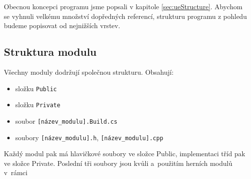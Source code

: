 \FloatBarrier

Obecnou koncepci programu jsme popsali v kapitole \ref{sec:ueStructure}. Abychom se vyhnuli velkému množství dopředných referencí, strukturu programu z pohledu \CPP{} budeme popisovat od nejnižších vrstev.

\subsection{Struktura modulu}
Všechny moduly dodržují společnou strukturu. Obsahují:
\begin{itemize}
	\item složku \verb!Public!
	\item složku \verb!Private!
	\item soubor \verb![název_modulu].Build.cs!
	\item soubory \verb![název_modulu].h!, \verb![název_modulu].cpp!
\end{itemize}


Každý modul pak má hlavičkové soubory ve složce Public, implementaci tříd pak ve složce Private. Poslední tři soubory jsou kvůli \UBT{} a~použitím herních modulů v~rámci \UE{}












